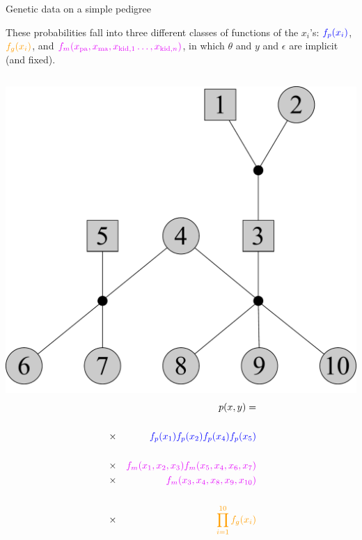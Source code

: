 \documentclass[letter,graphicx]{beamer}
\begin{document}
\begin{frame}{Genetic data on a simple pedigree}

These probabilities fall into three different classes of functions of the $x_i$'s: $\textcolor{pcolor}{f_p(x_i)}$, $\textcolor{gcolor}{f_g(x_i)}$, and $\textcolor{mcolor}{f_m(x_\mathrm{pa}, x_\mathrm{ma}, x_{\mathrm{kid},1} \ldots, x_{\mathrm{kid},n})}$, in which $\theta$ and $y$ and $\epsilon$ are implicit (and fixed).  

\vspace*{-1em}

\begin{columns}
\hspace*{-2em}
\includegraphics[width = 1.60\textwidth]{./images/three-gen-ped-basic.pdf}
\begin{eqnarray*}
 & & p(x,y) = \\
~\\
 &\times &  \textcolor{pcolor}{f_p(x_1)f_p(x_2)f_p(x_4)f_p(x_5)}  \\
~ \\ 
 & \times& \textcolor{mcolor}{f_m(x_1,x_2,x_3) f_m(x_5,x_4,x_6, x_7)}  \\
 & \times& \textcolor{mcolor}{f_m(x_3,x_4,x_8, x_9, x_{10})}  \\
~\\
 & \times& \textcolor{gcolor}{\prod_{i=1}^{10} f_g(x_i)}
\end{eqnarray*}
\end{columns}
\end{frame}
\end{document}
